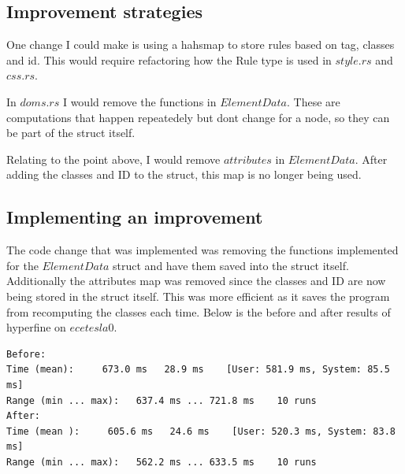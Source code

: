 \documentclass[12pt]{article}
\begin{document}
\subsection{Improvement strategies}
One change I could make is using a hahsmap to store rules based on tag, classes and id.
This would require refactoring how the Rule type is used in $style.rs$ and $css.rs$.

In $doms.rs$ I would remove the functions in $ElementData$.
These are computations that happen repeatedely but dont change for a node, so they can be part of the struct itself.

Relating to the point above, I would remove $attributes$ in $ElementData$.
After adding the classes and ID to the struct, this map is no longer being used.

\subsection{Implementing an improvement}
The code change that was implemented was removing the functions implemented for the $ElementData$ struct and have them saved into the struct itself.
Additionally the attributes map was removed since the classes and ID are now being stored in the struct itself.
This was more efficient as it saves the program from recomputing the classes each time.
Below is the before and after results of hyperfine on $ecetesla0$.
\begin{lstlisting}
Before:
Time (mean):     673.0 ms   28.9 ms    [User: 581.9 ms, System: 85.5 ms]
Range (min ... max):   637.4 ms ... 721.8 ms    10 runs
After:
Time (mean ):     605.6 ms   24.6 ms    [User: 520.3 ms, System: 83.8 ms]
Range (min ... max):   562.2 ms ... 633.5 ms    10 runs
 
\end{lstlisting}
\end{document}
